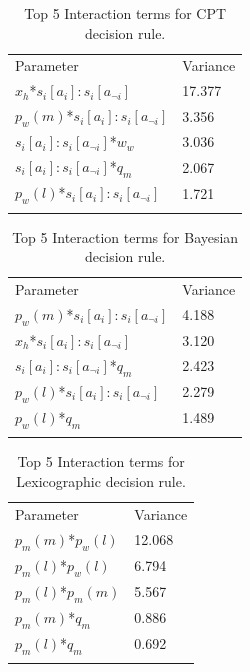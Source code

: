 \documentclass[graybox]{svmult}
\begin{document}
\begin{table}[H]
\caption{Top 5 Interaction terms for \ac{CPT} decision rule. \label{tab:sa_interaction_prospect_sig_iqr}}
\begin{tabular} {ll}
\hline\noalign{\smallskip}
Parameter & Variance \\ 
\noalign{\smallskip}\svhline\noalign{\smallskip}

\(x_{h}\)*\(s_{i}[a_{i}]:s_{i}[a_{\neg i}]\) & 17.377\\
\(p_{w}(m)\)*\(s_{i}[a_{i}]:s_{i}[a_{\neg i}]\) & 3.356\\
\(s_{i}[a_{i}]:s_{i}[a_{\neg i}]\)*\(w_{w}\) & 3.036\\
\(s_{i}[a_{i}]:s_{i}[a_{\neg i}]\)*\(q_{m}\) & 2.067\\
\(p_{w}(l)\)*\(s_{i}[a_{i}]:s_{i}[a_{\neg i}]\) & 1.721\\
\noalign{\smallskip}\hline\noalign{\smallskip}
\end{tabular}
\end{table}

\begin{table}[H]
\caption{Top 5 Interaction terms for Bayesian decision rule. \label{tab:sa_interaction_sharing_sig_iqr}}
\begin{tabular} {ll}
\hline\noalign{\smallskip}
Parameter & Variance \\
\noalign{\smallskip}\svhline\noalign{\smallskip}
\(p_{w}(m)\)*\(s_{i}[a_{i}]:s_{i}[a_{\neg i}]\) & 4.188\\
\(x_{h}\)*\(s_{i}[a_{i}]:s_{i}[a_{\neg i}]\) & 3.120\\
\(s_{i}[a_{i}]:s_{i}[a_{\neg i}]\)*\(q_{m}\) & 2.423\\
\(p_{w}(l)\)*\(s_{i}[a_{i}]:s_{i}[a_{\neg i}]\) & 2.279\\
\(p_{w}(l)\)*\(q_{m}\) & 1.489\\
\noalign{\smallskip}\hline\noalign{\smallskip}
\end{tabular}
\end{table}

\begin{table}[H]
\caption{Top 5 Interaction terms for Lexicographic decision rule. \label{tab:sa_interaction_lexic_sig_iqr}}
\begin{tabular} {ll}
\hline\noalign{\smallskip}
Parameter & Variance \\
\noalign{\smallskip}\svhline\noalign{\smallskip}
\(p_{m}(m)\)*\(p_{w}(l)\) & 12.068\\
\(p_{m}(l)\)*\(p_{w}(l)\) & 6.794\\
\(p_{m}(l)\)*\(p_{m}(m)\) & 5.567\\
\(p_{m}(m)\)*\(q_{m}\) & 0.886\\
\(p_{m}(l)\)*\(q_{m}\) & 0.692\\
\noalign{\smallskip}\hline\noalign{\smallskip}
\end{tabular}
\end{table}
\end{document}
